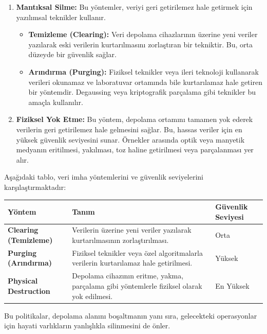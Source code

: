 \begin{enumerate}
    \item \textbf{Mantıksal Silme:} Bu yöntemler, veriyi geri getirilemez hale getirmek için yazılımsal teknikler kullanır.
    \begin{itemize}
        \item \textbf{Temizleme (Clearing):} Veri depolama cihazlarının üzerine yeni veriler yazılarak eski verilerin kurtarılmasını zorlaştıran bir tekniktir. Bu, orta düzeyde bir güvenlik sağlar.
        \item \textbf{Arındırma (Purging):} Fiziksel teknikler veya ileri teknoloji kullanarak verileri okunamaz ve laboratuvar ortamında bile kurtarılamaz hale getiren bir yöntemdir. Degaussing veya kriptografik parçalama gibi teknikler bu amaçla kullanılır.
    \end{itemize}
    \item \textbf{Fiziksel Yok Etme:} Bu yöntem, depolama ortamını tamamen yok ederek verilerin geri getirilemez hale gelmesini sağlar. Bu, hassas veriler için en yüksek güvenlik seviyesini sunar. Örnekler arasında optik veya manyetik medyanın eritilmesi, yakılması, toz haline getirilmesi veya parçalanması yer alır.
\end{enumerate}

Aşağıdaki tablo, veri imha yöntemlerini ve güvenlik seviyelerini karşılaştırmaktadır:

\begin{center}
\begin{tabular}{|p{4cm}|p{6cm}|p{4cm}|}
\hline
\hline
\textbf{Yöntem} & \textbf{Tanım} & \textbf{Güvenlik Seviyesi}  \\
\hline
\hline
\textbf{Clearing (Temizleme)} & Verilerin üzerine yeni veriler yazılarak kurtarılmasının zorlaştırılması. & Orta  \\
\hline
\hline
\textbf{Purging (Arındırma)} & Fiziksel teknikler veya özel algoritmalarla verilerin kurtarılamaz hale getirilmesi. & Yüksek  \\
\hline
\hline
\textbf{Physical Destruction} & Depolama cihazının eritme, yakma, parçalama gibi yöntemlerle fiziksel olarak yok edilmesi. & En Yüksek  \\
\hline
\hline
\hline
\end{tabular}
\end{center}

Bu politikalar, depolama alanını boşaltmanın yanı sıra, gelecekteki operasyonlar için hayati varlıkların yanlışlıkla silinmesini de önler.

